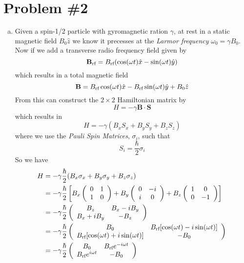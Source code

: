 \documentclass[11pt]{article}
\numberwithin{equation}{section}
\begin{document}
\section{Problem \#2}
\begin{enumerate}[(a)]
\item
Given a spin-1/2 particle with gyromagnetic ration $\gamma$, at rest in a static magnetic field $B_0\hat{z}$ we know it precesses at the \emph{Larmor frequency} $\omega_0 = \gamma B_0$. Now if we add a transverse radio frequency field given by
$$\mathbf{B}_{\textnormal{rf}} = B_{\textnormal{rf}}(\cos(\omega t)\hat{x} - \sin(\omega t)\hat{y})$$
which results in a total magnetic field
$$\mathbf{B} = B_{\textnormal{rf}}\cos(\omega t)\hat{x} - B_{\textnormal{rf}}\sin(\omega t)\hat{y} +B_0\hat{z}$$
From this can construct the $2\times 2$ Hamiltonian matrix by
$$H = -\gamma\mathbf{B}\cdot\mathbf{S}$$
which results in
$$H = -\gamma(B_xS_x + B_yS_y + B_zS_z)$$
where we use the \emph{Pauli Spin Matrices}, $\sigma_i$, such that
$$S_i = \frac{\hbar}{2}\sigma_i$$
So we have 
\begin{align*}
H &= -\gamma\frac{\hbar}{2}(B_x\sigma_x + B_y\sigma_y + B_z\sigma_z)\\
&= -\gamma\frac{\hbar}{2}\left[
B_x\left(\begin{array}{cc}
0  &1\\
1  &0  \end{array}\right)
+ B_y\left(\begin{array}{cc}
0  &-i\\
i  &0  \end{array}\right)
+ B_z\left(\begin{array}{cc}
1  &0\\
0  &-1  \end{array}\right)
\right]\\
&= -\gamma\frac{\hbar}{2}\left(\begin{array}{cc}
                         B_z           &B_x - iB_y\\
                         B_x + iB_y    &-B_z      \\
                         \end{array}\right)\\
&= -\gamma\frac{\hbar}{2}\left(\begin{array}{cc}
                         B_0      &B_{\textnormal{rf}}[\cos(\omega t) - i\sin(\omega t)]\\
                         B_{\textnormal{rf}}[\cos(\omega t) + i\sin(\omega t)]    &-B_0 \\
                         \end{array}\right)\\
&= -\gamma\frac{\hbar}{2}\left(\begin{array}{cc}
                         B_0      &B_{\textnormal{rf}}e^{-i\omega t}\\
                         B_{\textnormal{rf}}e^{i\omega t}    &-B_0 \\
                         \end{array}\right)
\end{align*}


\end{enumerate}
\end{document}
